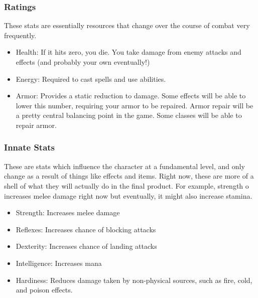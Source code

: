 \documentclass{article}
\begin{document}
\subsubsection{Ratings}
These stats are essentially resources that change over the course of combat very frequently.
\begin{itemize}
    \item Health: If it hits zero, you die. You take damage from enemy attacks and effects (and probably
        your own eventually!)
    \item Energy: Required to cast spells and use abilities.
    \item Armor: Provides a static reduction to damage. Some effects will be able to lower this number,
        requiring your armor to be repaired. Armor repair
        will be a pretty central balancing point in the game. Some classes will be able to repair armor.
\end{itemize}

\subsubsection{Innate Stats}
These are stats which influence the character at a fundamental level, and only change as a result of things
like effects and items. Right now, these are more of a shell of what they will actually do in the final
product. For example, strength o increases melee damage right now but eventually, it might also increase stamina.
\begin{itemize}
    \item Strength: Increases melee damage
    \item Reflexes: Increases chance of blocking attacks
    \item Dexterity: Increases chance of landing attacks
    \item Intelligence: Increases mana
    \item Hardiness: Reduces damage taken by non-physical sources, such as fire, cold, and poison effects.
\end{itemize}
\end{document}
